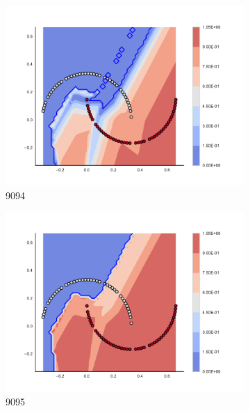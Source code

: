 \begin{figure}[h]
\begin{subfigure}[b]{0.09\textwidth}
    \includegraphics[clip, trim=2.35cm 1.75cm 4.5cm 0cm,width=\textwidth]{img/convergence/9094.pdf}
    \caption{9094}
    \label{fig:convergence_9094}
\end{subfigure}
%
\begin{subfigure}[b]{0.09\textwidth}
    \includegraphics[clip, trim=2.35cm 1.75cm 4.5cm 0cm,width=\textwidth]{img/convergence/9095.pdf}
    \caption{9095}
    \label{fig:convergence_9095}
\end{subfigure}
%
\begin{subfigure}[b]{0.09\textwidth}

\end{subfigure}
\end{figure}
